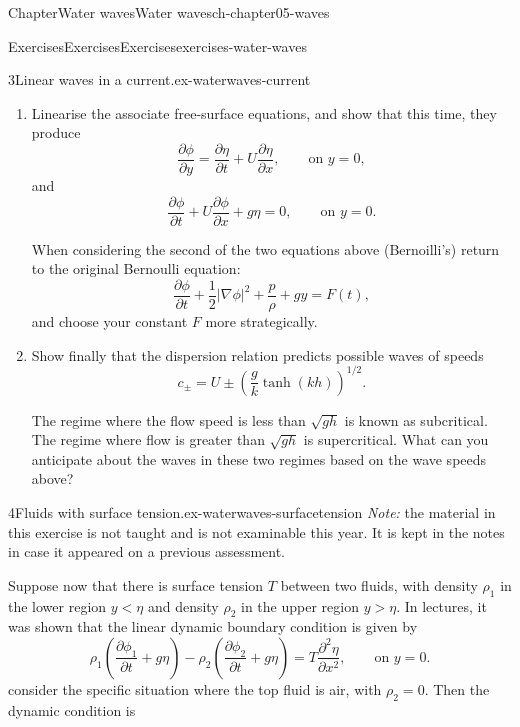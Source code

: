 \documentclass[oneside,10pt,]{book}
\numberwithin{equation}{section}
\newcommand{\pd}[2]{\frac{\partial#1}{\partial#2}}
\begin{document}
\begin{chapterptx}{Chapter}{Water waves}{}{Water waves}{}{}{ch-chapter05-waves}
\begin{exercises-section}{Exercises}{Exercises}{}{Exercises}{}{}{exercises-water-waves}
\begin{divisionexercise}{3}{Linear waves in a current.}{}{ex-waterwaves-current}
\begin{enumerate}[font=\bfseries,label=(\alph*),ref=\alph*]
\begin{equation*}
\end{equation*}
and again linearise the necessary equations.%
\item{}Linearise the associate free-surface equations, and show that this time, they produce%
\begin{equation*}
\pd{\phi}{y} = \pd{\eta}{t} + U \pd{\eta}{x}, \qquad \text{on $y = 0$},
\end{equation*}
and%
\begin{equation*}
\pd{\phi}{t} + U \pd{\phi}{x} + g\eta = 0, \qquad \text{on $y = 0$}.
\end{equation*}
%
\par
When considering the second of the two equations above (Bernoilli's) return to the original Bernoulli equation:%
\begin{equation*}
\pd{\phi}{t} + \frac{1}{2}|\nabla \phi|^2 + \frac{p}{\rho} + gy = F(t),
\end{equation*}
and choose your constant \(F\) more strategically.%
\item{}Show finally that the dispersion relation predicts possible waves of speeds%
\begin{equation*}
c_{\pm} = U \pm \left( \frac{g}{k} \tanh(kh)\right)^{1/2}.
\end{equation*}
%
\par
The regime where the flow speed is less than \(\sqrt{gh}\) is known as subcritical. The regime where flow is greater than \(\sqrt{gh}\) is supercritical. What can you anticipate about the waves in these two regimes based on the wave speeds above?%
\end{enumerate}%
\end{divisionexercise}%
\begin{divisionexercise}{4}{Fluids with surface tension.}{}{ex-waterwaves-surfacetension}%
\emph{Note:} the material in this exercise is not taught and is not examinable this year. It is kept in the notes in case it appeared on a previous assessment.%
\par
Suppose now that there is surface tension \(T\) between two fluids, with density \(\rho_1\) in the lower region \(y < \eta\) and density \(\rho_2\) in the upper region \(y > \eta\). In lectures, it was shown that the linear dynamic boundary condition is given by%
\begin{equation*}
\rho_1\left( \pd{\phi_1}{t} + g\eta\right) - \rho_2 \left( \pd{\phi_2}{t} + g\eta\right) = T \pd{^2 \eta}{x^2}, \qquad \text{on $y = 0$}.
\end{equation*}
consider the specific situation where the top fluid is air, with \(\rho_2 = 0\). Then the dynamic condition is%

\end{divisionexercise}
\end{exercises-section}
\end{chapterptx}
\end{document}
